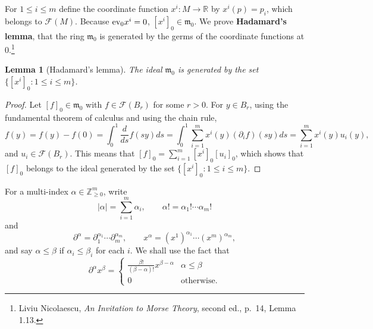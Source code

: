 \documentclass{article}
\newcommand{\ev}{\ensuremath\mathrm{ev}}
\newtheorem{lemma}[theorem]{Lemma}
\theoremstyle{definition}
\begin{document}
For $1 \leq i \leq m$ define the coordinate function $x^i:M \to \mathbb{R}$ by $x^i(p) = p_i$, which belongs to
$\mathcal{F}(M)$. Because $\ev_0 x^i = 0$, $[x^i]_0 \in \mathfrak{m}_0$. We prove 
\textbf{Hadamard's lemma},
that the ring $\mathfrak{m}_0$ is generated
by the germs of the coordinate functions at $0$.\footnote{Liviu Nicolaescu, {\em An Invitation to Morse Theory}, second ed.,
p.~14, Lemma 1.13.}

\begin{lemma}[Hadamard's lemma]
The ideal $\mathfrak{m}_0$ is generated by the set $\{[x^i]_0: 1 \leq i \leq m\}$.
\label{hadamard}
\end{lemma}
\begin{proof}
Let $[f]_0 \in \mathfrak{m}_0$ with $f \in \mathcal{F}(B_r)$ for some $r>0$. For
$y \in B_r$, using the fundamental theorem of calculus and using the chain rule,
\[
f(y) = f(y) - f(0) = \int_0^1 \frac{d}{ds} f(sy) ds = \int_0^1 \sum_{i=1}^m x^i(y) (\partial_i f)(sy) ds
=\sum_{i=1}^m x^i(y) u_i(y),
\]
and $u_i \in \mathcal{F}(B_r)$. This means that
$[f]_0 = \sum_{i=1}^m [x^i]_0 [u_i]_0$, which shows that $[f]_0$ belongs to the ideal generated by 
the set  $\{[x^i]_0: 1 \leq i \leq m\}$. 
\end{proof}



For a  multi-index $\alpha \in \mathbb{Z}_{\geq 0}^m$, write
\[
|\alpha| = \sum_{i=1}^m \alpha_i,\qquad \alpha! = \alpha_1! \cdots \alpha_m!
\]
and
\[
\partial^\alpha = \partial_1^{\alpha_1} \cdots \partial_m^{\alpha_m},\qquad x^\alpha = (x^1)^{\alpha_1} \cdots (x^m)^{\alpha_m},
\]
and say $\alpha \leq \beta$ if $\alpha_i \leq \beta_i$ for each $i$.
We shall use the fact that
\[
\partial^\alpha x^\beta = \begin{cases}
\frac{\beta!}{(\beta-\alpha)!} x^{\beta-\alpha}&\alpha \leq \beta\\
0&\textrm{otherwise}.
\end{cases}
\]
\end{document}
